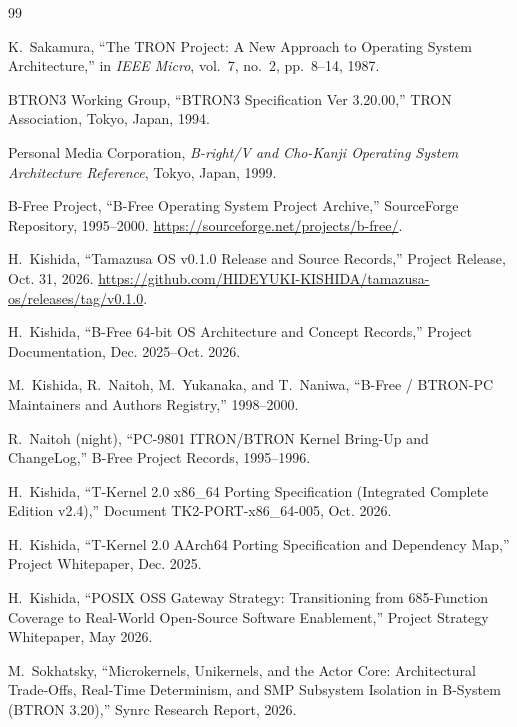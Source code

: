 \documentclass[10pt,journal,compsoc,twocolumn]{article}
\begin{document}
\begin{thebibliography}{99}
\footnotesize
\setlength{\itemsep}{0.5pt}
\setlength{\parskip}{0pt}

K.~Sakamura, ``The TRON Project: A New Approach to Operating System Architecture,'' in \emph{IEEE Micro}, vol.~7, no.~2, pp.~8--14, 1987.

BTRON3 Working Group, ``BTRON3 Specification Ver 3.20.00,'' TRON Association, Tokyo, Japan, 1994.

Personal Media Corporation, \emph{B-right/V and Cho-Kanji Operating System Architecture Reference}, Tokyo, Japan, 1999.

B-Free Project, ``B-Free Operating System Project Archive,'' SourceForge Repository, 1995--2000. \url{https://sourceforge.net/projects/b-free/}.

H.~Kishida, ``Tamazusa OS v0.1.0 Release and Source Records,'' Project Release, Oct. 31, 2026. \url{https://github.com/HIDEYUKI-KISHIDA/tamazusa-os/releases/tag/v0.1.0}.

H.~Kishida, ``B-Free 64-bit OS Architecture and Concept Records,'' Project Documentation, Dec. 2025--Oct. 2026.

M.~Kishida, R.~Naitoh, M.~Yukanaka, and T.~Naniwa, ``B-Free / BTRON-PC Maintainers and Authors Registry,'' 1998--2000.

R.~Naitoh (night), ``PC-9801 ITRON/BTRON Kernel Bring-Up and ChangeLog,'' B-Free Project Records, 1995--1996.

H.~Kishida, ``T-Kernel 2.0 x86\_64 Porting Specification (Integrated Complete Edition v2.4),'' Document TK2-PORT-x86\_64-005, Oct. 2026.

H.~Kishida, ``T-Kernel 2.0 AArch64 Porting Specification and Dependency Map,'' Project Whitepaper, Dec. 2025.

H.~Kishida, ``POSIX OSS Gateway Strategy: Transitioning from 685-Function Coverage to Real-World Open-Source Software Enablement,'' Project Strategy Whitepaper, May 2026.

M.~Sokhatsky, ``Microkernels, Unikernels, and the Actor Core: Architectural Trade-Offs, Real-Time Determinism, and SMP Subsystem Isolation in B-System (BTRON 3.20),'' Synrc Research Report, 2026.


\end{thebibliography}
\end{document}
